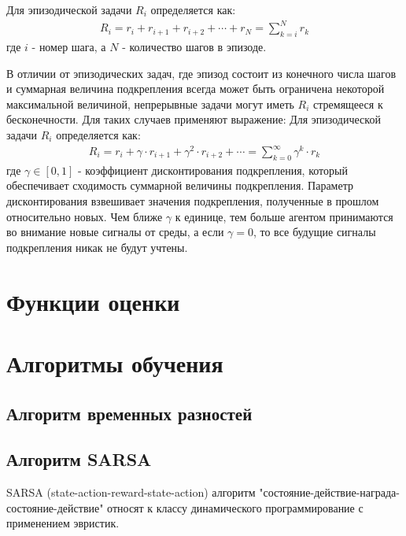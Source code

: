 Для эпизодической задачи $ R_i $ определяется как:
\begin{equation}
\label{eq:1_1p1}
\begin{alignedat}{2}
R_i=r_i + r_{i+1} + r_{i+2} + \cdots + r_N = \sum \limits_{k=i}^{N}r_k \end{alignedat}
\end{equation}
где $ i $ - номер шага, а $ N $ - количество шагов в эпизоде.

В отличии от эпизодических задач, где эпизод состоит из конечного числа шагов и суммарная величина подкрепления всегда может быть ограничена некоторой максимальной величиной, непрерывные задачи могут иметь $ R_i $ стремящееся к бесконечности. Для таких случаев применяют выражение:
Для эпизодической задачи $ R_i $ определяется как:
\begin{equation}
\label{eq:1_1p2}
\begin{alignedat}{2}
R_i=r_i + \gamma \cdot r_{i+1} + \gamma^2 \cdot r_{i+2} + \cdots = \sum \limits_{k=0}^{\infty}\gamma^k \cdot r_k
\end{alignedat}
\end{equation}
где $ \gamma \in [0, 1]$ - коэффициент дисконтирования подкрепления, который обеспечивает сходимость суммарной величины подкрепления.  
Параметр дисконтирования взвешивает значения подкрепления, полученные в прошлом относительно новых. Чем ближе $ \gamma $ к единице, тем больше агентом принимаются во внимание новые сигналы от среды, а если $ \gamma = 0 $, то все будущие сигналы подкрепления никак не будут учтены. 

\section{Функции оценки} \label{sect1_2}

\section{Алгоритмы обучения} \label{sect1_3}

\subsection{Алгоритм временных разностей} \label{subsect1_3_1}

\subsection{Алгоритм SARSA} \label{subsect1_3_2}
SARSA (state-action-reward-state-action) алгоритм "состояние-действие-награда-состояние-действие" относят к классу динамического программирование с применением эвристик. 

